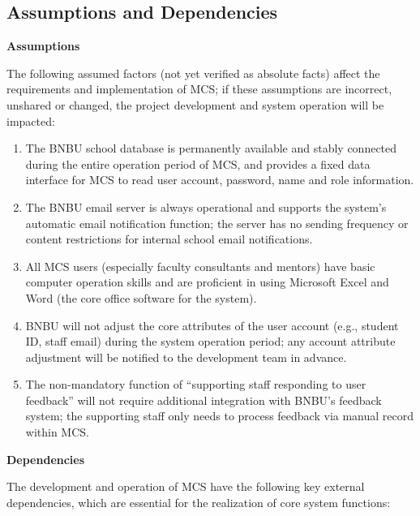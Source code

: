 \documentclass[a4paper,12pt]{article}
\begin{document}
\subsection{Assumptions and Dependencies}

\textbf{Assumptions}

The following assumed factors (not yet verified as absolute facts) affect the requirements and implementation of MCS; if these assumptions are incorrect, unshared or changed, the project development and system operation will be impacted:

\begin{enumerate}
\item The BNBU school database is permanently available and stably connected during the entire operation period of MCS, and provides a fixed data interface for MCS to read user account, password, name and role information.
\item The BNBU email server is always operational and supports the system's automatic email notification function; the server has no sending frequency or content restrictions for internal school email notifications.
\item All MCS users (especially faculty consultants and mentors) have basic computer operation skills and are proficient in using Microsoft Excel and Word (the core office software for the system).
\item BNBU will not adjust the core attributes of the user account (e.g., student ID, staff email) during the system operation period; any account attribute adjustment will be notified to the development team in advance.
\item The non-mandatory function of ``supporting staff responding to user feedback'' will not require additional integration with BNBU's feedback system; the supporting staff only needs to process feedback via manual record within MCS.
\end{enumerate}

\textbf{Dependencies}

The development and operation of MCS have the following key external dependencies, which are essential for the realization of core system functions:
\end{document}
